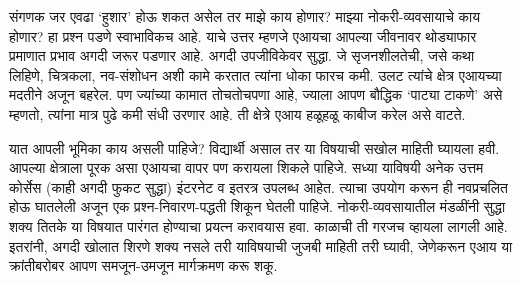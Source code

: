 संगणक जर एवढा `हुशार' होऊ शकत असेल तर माझे काय होणार? माझ्या नोकरी-व्यवसायाचे काय होणार? हा प्रश्न पडणे स्वाभाविकच आहे. याचे उत्तर म्हणजे एआयचा आपल्या जीवनावर थोड्याफार प्रमाणात प्रभाव अगदी जरूर पडणार आहे. अगदी उपजीविकेवर सुद्धा. जे सृजनशीलतेची, जसे कथा लिहिणे, चित्रकला, नव-संशोधन अशी कामे करतात त्यांना धोका फारच कमी. उलट त्यांचे क्षेत्र एआयच्या मदतीने अजून बहरेल. पण ज्यांच्या कामात तोचतोचपणा आहे, ज्याला आपण बौद्धिक `पाट्या टाकणे' असे म्हणतो, त्यांना मात्र पुढे कमी संधी उरणार आहे. ती क्षेत्रे एआय हळूहळू काबीज करेल असे वाटते.

यात आपली भूमिका काय असली पाहिजे? विद्यार्थी असाल तर या विषयाची सखोल माहिती घ्यायला हवी. आपल्या क्षेत्राला पूरक असा एआयचा वापर पण करायला शिकले पाहिजे. सध्या याविषयी अनेक उत्तम कोर्सेस (काही अगदी फुकट  सुद्धा) इंटरनेट व इतरत्र उपलब्ध आहेत. त्याचा उपयोग करून ही नवप्रचलित होऊ घातलेली अजून एक प्रश्न-निवारण-पद्धती  शिकून घेतली पाहिजे. नोकरी-व्यवसायातील मंडळींनी सुद्धा शक्य तितके या विषयात पारंगत होण्याचा प्रयत्न करावयास हवा. काळाची ती गरजच व्हायला लागली आहे. इतरांनी, अगदी खोलात शिरणे शक्य नसले तरी याविषयाची जुजबी माहिती तरी घ्यावी, जेणेकरून एआय या क्रांतीबरोबर आपण समजून-उमजून मार्गक्रमण करू शकू.




